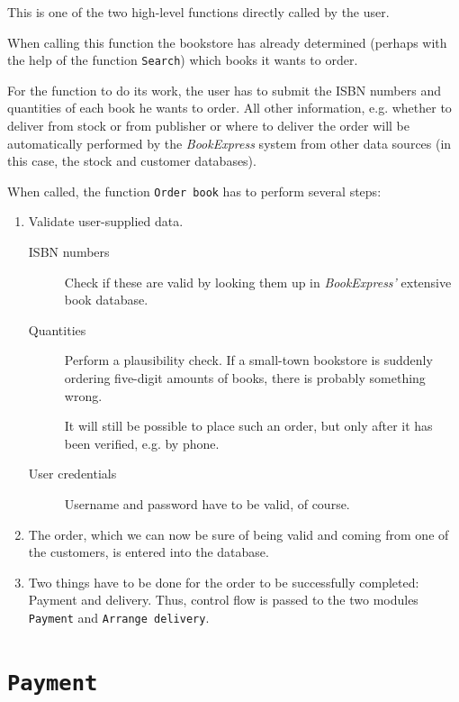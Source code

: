 This is one of the two high-level functions directly called by the user.

When calling this function the bookstore has already determined (perhaps with the help of the function \texttt{Search})
which books it wants to order.

For the function to do its work, the user has to submit the ISBN numbers and quantities of each book he wants to order.
All other information, e.g. whether to deliver from stock or from publisher or where to deliver the order will be automatically
performed by the \emph{BookExpress} system from other data sources (in this case, the stock and customer databases).

When called, the function \texttt{Order book} has to perform several steps:
\begin{enumerate}
	\item Validate user-supplied data.

		  \begin{description}
		  	\item[ISBN numbers] Check if these are valid by looking them up in \emph{BookExpress'} extensive book database.
			\item[Quantities]   Perform a plausibility check. If a small-town bookstore is suddenly ordering five-digit amounts of books,
			                    there is probably something wrong.

								It will still be possible to place such an order, but only after it has been verified, e.g. by phone.
			\item[User credentials] Username and password have to be valid, of course.
		  \end{description}
   \item The order, which we can now be sure of being valid and coming from one of the customers, is entered into the database.
   \item Two things have to be done for the order to be successfully completed: Payment and delivery. Thus, control flow is passed to the
         two modules \texttt{Payment} and \texttt{Arrange delivery}.
\end{enumerate}

\section{\texttt{Payment}}

